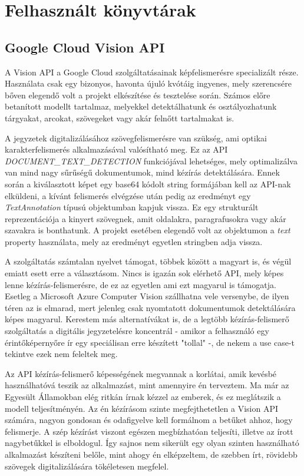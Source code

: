 \chapter{Felhasznált könyvtárak}

\section{Google Cloud Vision API}

A Vision API a Google Cloud szolgáltatásainak képfelismerésre specializált része. Használata csak egy bizonyos, havonta újuló kvótáig ingyenes, mely szerencsére bőven elegendő volt a projekt elkészítése és tesztelése során. Számos előre betanított modellt tartalmaz, melyekkel detektálhatunk és osztályozhatunk tárgyakat, arcokat, szövegeket vagy akár felnőtt tartalmakat is. \cite{Vision}

A jegyzetek digitalizálásához szövegfelismerésre van szükség, ami optikai karakterfelismerés alkalmazásával valósítható meg. Ez az API \emph{DOCUMENT\_TEXT\_DETECTION} funkciójával lehetséges, mely optimalizálva van mind nagy sűrűségű dokumentumok, mind kézírás detektálására. Ennek során a kiválasztott képet egy base64 kódolt string formájában kell az API-nak elküldeni, a kívánt felismerés elvégzése után pedig az eredményt egy \emph{TextAnnotation} típusú objektumban kapjuk vissza. Ez egy strukturált reprezentációja a kinyert szövegnek, amit oldalakra, paragrafusokra vagy akár szavakra is bonthatunk. A projekt esetében elegendő volt az objektumon a \emph{text} property használata, mely az eredményt egyetlen stringben adja vissza. 

A szolgáltatás számtalan nyelvet támogat, többek között a magyart is, és végül emiatt esett erre a választásom. Nincs is igazán sok elérhető API, mely képes lenne kézírás-felismerésre, de ez az egyetlen ami ezt magyarul is támogatja. Esetleg a Microsoft Azure Computer Vision szállhatna vele versenybe, de ilyen téren az is elmarad, mert jelenleg csak nyomtatott dokumentumok detektálására képes magyarul. Kerestem más alternatívákat is, de a legtöbb kézírás-felismerő szolgáltatás a digitális jegyzetelésre koncentrál - amikor a felhasználó egy érintőképernyőre ír egy speciálisan erre készített "tollal" -, de nekem a use case-t tekintve ezek nem feleltek meg.

Az API kézírás-felismerő képességének megvannak a korlátai, amik kevésbé használhatóvá teszik az alkalmazást, mint amennyire én terveztem. Ma már az Egyesült Államokban elég ritkán írnak kézzel az emberek, és ez meglátszik a modell teljesítményén. Az én kézírásom szinte megfejthetetlen a Vision API számára, nagyon gondosan és odafigyelve kell formálnom a betűket ahhoz, hogy felismerje. A szép kézírást viszont egészen megbízhatóan teljesíti, illetve az írott nagybetűkkel is elboldogul. Így sajnos nem sikerült egy olyan szinten használható alkalmazást készíteni belőle, mint ahogy én elképzeltem, de szebben írt, rövidebb szövegek digitalizálására tökéletesen megfelel. 

